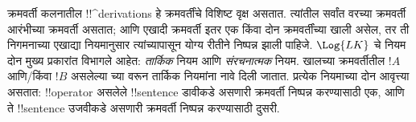\documentclass[../../../include/open-logic-section]{subfiles}
\begin{document}
क्रमवर्ती कलनातील !!^{derivation}s हे क्रमवर्तींचे विशिष्ट वृक्ष असतात.
त्यांतील सर्वांत वरच्या क्रमवर्ती आरंभीच्या क्रमवर्ती असतात; आणि एखादी
क्रमवर्ती इतर एक किंवा दोन क्रमवर्तींच्या खाली असेल, तर ती निगमनाच्या
एखाद्या नियमानुसार त्यांच्यापासून योग्य रीतीने निष्पन्न झाली पाहिजे.
$\Log{LK}$ चे नियम दोन मुख्य प्रकारांत विभागले आहेत: \emph{तार्किक} नियम
आणि \emph{संरचनात्मक} नियम. खालच्या क्रमवर्तीतील $!A$ आणि/किंवा $!B$
असलेल्या च्या वरून तार्किक नियमांना नावे दिली
जातात. प्रत्येक नियमाच्या दोन आवृत्त्या असतात: !!{operator} असलेले
!!{sentence} डावीकडे असणारी क्रमवर्ती निष्पन्न करण्यासाठी एक, आणि ते
!!{sentence} उजवीकडे असणारी क्रमवर्ती निष्पन्न करण्यासाठी दुसरी.
\end{document}
